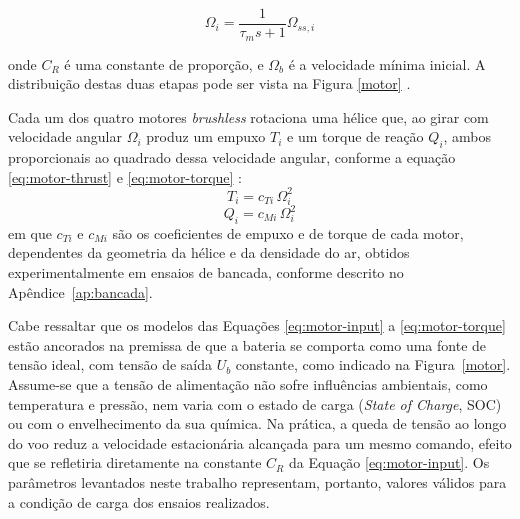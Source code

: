\begin{equation}
  \Omega_{i}= \frac{1}{\tau_m s + 1} \Omega_{ss,i}
  \label{eq:motor-input2}
\end{equation}

onde $C_R$ é uma constante de proporção, e $\Omega_b$ é a velocidade mínima inicial. A distribuição destas duas etapas pode ser vista na Figura \ref{motor} \cite{Quan2017}.

Cada um dos quatro motores \textit{brushless} rotaciona uma hélice que, ao girar com velocidade angular $\Omega_i$ produz um empuxo $T_i$ e um torque de reação $Q_i$, ambos proporcionais ao quadrado dessa velocidade angular, conforme a equação \ref{eq:motor-thrust} e \ref{eq:motor-torque} \cite{Graesdal2021,Quan2017,Cortez2022}:
\begin{equation}
    T_i = c_{Ti}\,\Omega_i^{2}
    \label{eq:motor-thrust}
\end{equation}
\begin{equation}
  Q_i = c_{Mi}\,\Omega_i^{2}
  \label{eq:motor-torque}
\end{equation}
em que $c_{Ti}$ e $c_{Mi}$ são os coeficientes de empuxo e de torque de cada motor, dependentes da geometria da hélice e da densidade do ar, obtidos experimentalmente em ensaios de bancada, conforme descrito no Apêndice~\ref{ap:bancada}.

Cabe ressaltar que os modelos das Equações \eqref{eq:motor-input} a \eqref{eq:motor-torque} estão ancorados na premissa de que a bateria se comporta como uma fonte de tensão ideal{\color{blue}, com tensão de saída $U_b$ constante, como indicado na Figura~\ref{motor}}. Assume-se que a tensão de alimentação não sofre influências ambientais, como temperatura e pressão, nem varia com o estado de carga (\textit{State of Charge}, SOC) ou com o envelhecimento da sua química. Na prática, a queda de tensão ao longo do voo reduz a velocidade estacionária alcançada para um mesmo comando, efeito que se refletiria diretamente na constante $C_R$ da Equação \eqref{eq:motor-input}. Os parâmetros levantados neste trabalho representam, portanto, valores válidos para a condição de carga dos ensaios realizados.

